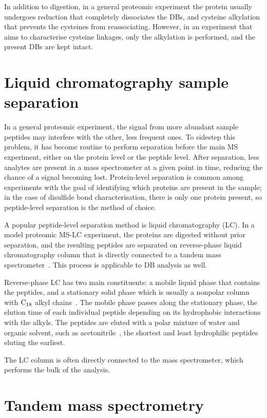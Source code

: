 In addition to digestion, in a general proteomic experiment the protein usually undergoes reduction that completely dissociates the DBs, and cysteine alkylation that prevents the cysteines from reassociating. However, in an experiment that aims to characterise cysteine linkages, only the alkylation is performed, and the present DBs are kept intact.

\section{Liquid chromatography sample separation}\label{sec:lc}

In a general proteomic experiment, the signal from more abundant sample peptides may interfere with the other, less frequent ones. To sidestep this problem, it has become routine to perform separation before the main MS experiment, either on the protein level or the peptide level. After separation, less analytes are present in a mass spectrometer at a given point in time, reducing the chance of a signal becoming lost. Protein-level separation is common among experiments with the goal of identifying which proteins are present in the sample; in the case of disulfide bond characterisation, there is only one protein present, so peptide-level separation is the method of choice.

A popular peptide-level separation method is liquid chromatography (LC). In a model proteomic MS-LC experiment, the proteins are digested without prior separation, and the resulting peptides are separated on reverse-phase liquid chromatography column that is directly connected to a tandem mass spectrometer~\cite{washburn2001large}. This process is applicable to DB analysis as well.

Reverse-phase LC has two main constituents: a mobile liquid phase that contains the peptides, and a stationary solid phase which is usually a nonpolar column with \(\ce{C18}\) alkyl chains~\cite{chang1976high}. The mobile phase passes along the stationary phase, the elution time of each individual peptide depending on its hydrophobic interactions with the alkyls. The peptides are eluted with a polar mixture of water and organic solvent, such as acetonitrile~\cite{frohlich2006proteome}, the shortest and least hydrophilic peptides eluting the earliest.

The LC column is often directly connected to the mass spectrometer, which performs the bulk of the analysis.


\section{Tandem mass spectrometry}\label{sec:msms}

